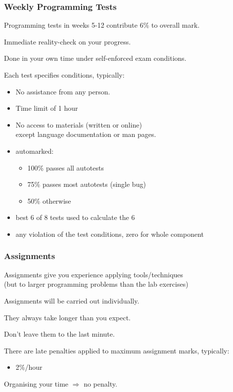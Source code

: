 \begin{frame}
\frametitle{Weekly Programming Tests}
Programming tests in weeks 5-12 contribute 6\% to overall mark.

Immediate reality-check on your progress.

Done in your own time under self-enforced exam conditions.

Each test specifies conditions, typically:

\begin{itemize}
\item No assistance from any person.
\item Time limit of 1 hour
\item No access to materials (written or online) \\
except language documentation or man pages.

\item  automarked:

\begin{itemize}
\item 100\% passes all autotests
\item 75\% passes most autotests (single bug)
\item 50\% otherwise
\end{itemize}
\item  best 6 of 8 tests used to calculate the 6%
\item  any violation of the test conditions, zero for whole component
\end{itemize}

\end{frame}

\begin{frame}
\frametitle{Assignments}
Assignments give you experience applying tools/techniques \\
{\small (but to larger programming problems than the lab exercises)}

Assignments will be carried out individually.

They always take longer than you expect.

Don't leave them to the last minute.

There are late penalties applied to maximum assignment marks,
typically:
\begin{itemize}
\item  2\%/hour
\end{itemize}
Organising your time $\Rightarrow$ no penalty.
\end{frame}

